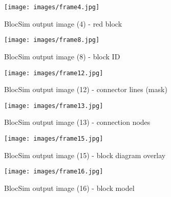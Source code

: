 \begin{figure}[ht!]
\centering
\texttt{[image: images/frame4.jpg]}
\caption{BlocSim output image (4) - red block \cite{blocsim}}
\label{im:frame4}
\end{figure}

\begin{figure}[ht!]
\centering
\texttt{[image: images/frame8.jpg]}
\caption{BlocSim output image (8) - block ID \cite{blocsim}}
\label{im:frame8}
\end{figure}

\begin{figure}[ht!]
\centering
\texttt{[image: images/frame12.jpg]}
\caption{BlocSim output image (12) - connector lines (mask) \cite{blocsim}}
\label{im:frame12}
\end{figure}

\begin{figure}[ht!]
\centering
\texttt{[image: images/frame13.jpg]}
\caption{BlocSim output image (13) - connection nodes \cite{blocsim}}
\label{im:frame13}
\end{figure}

\begin{figure}[ht!]
\centering
\texttt{[image: images/frame15.jpg]}
\caption{BlocSim output image (15) - block diagram overlay \cite{blocsim}}
\label{im:frame15}
\end{figure}

\begin{figure}[ht!]
\centering
\texttt{[image: images/frame16.jpg]}
\caption{BlocSim output image (16) - block model \cite{blocsim}}
\label{im:frame16}
\end{figure}

\clearpage




\begin{comment}

For more information regarding the ... of BlocSim, see the online materials outlined in Appendix \ref{ch:appendix}.

\begin{table}[ht]
	\center
	\begin{tabular}{$r^l^l} %
		\hline
		\rowstyle{\bfseries}
		H1 & H2 & H3 \\
		\hline
		Right & \gtick & \rcross \\
		A & B & C \\
		\hline
	\end{tabular}
	\caption{Dummy Table \cite{dummy:2012}}
	\label{tab:dummytable}
\end{table} 


\begin{itemize}
\item 
\end{itemize}


\end{comment}
